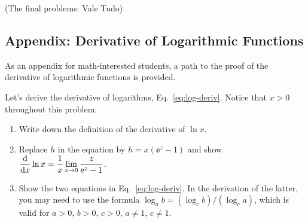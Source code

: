 \documentclass[11pt,pdfa,lastpage]{MishoNote}
\newcommand\starskip{\bigskip\begin{center}\pgfornament[width=7cm]{88}\end{center}\medskip}
\begin{document}
\starskip

\begin{enumerate}[resume]
 \itemC \textsf{(The final problems: Vale Tudo)}
    \begin{menumerate}{3}
   \end{menumerate}
 \end{enumerate}

\newpage

\subsection{Appendix: Derivative of Logarithmic Functions}
As an appendix for math-interested students, a path to the proof of the derivative of logarithmic functions is provided.


\starskip
\begin{enumerate}[resume]
  \itemC Let's derive the derivative of logarithms,  Eq.~\eqref{eq:log-deriv}. Notice that $x>0$ throughout this problem.
  \begin{enumerate}
    \item Write down the definition of the derivative of $\ln x$.
    \item Replace $h$ in the equation by $h=x(\ee^z-1)$ and show
    $\displaystyle\diff{}{x}\ln x = \frac{1}{x}\lim_{z\to 0} \frac{z}{\ee^z-1}$.
    \item Show the two equations in Eq.~\eqref{eq:log-deriv}. In the derivation of the latter, you may need to use the formula $\log_a b = ({\log_c b})/({\log_c a})$, which is valid for $a>0$, $b>0$, $c>0$, $a\neq 1$, $c\neq 1$.
  \end{enumerate}
\end{enumerate}
\end{document}
